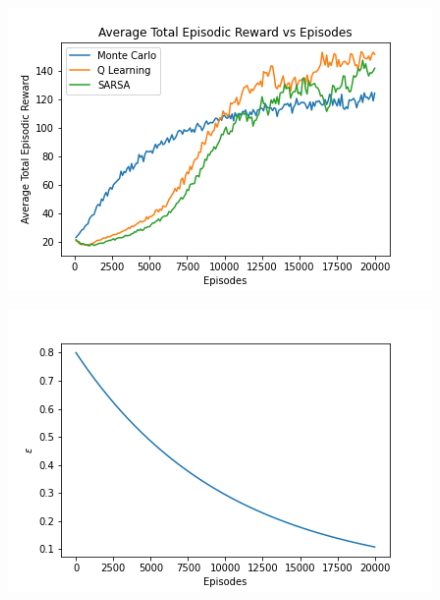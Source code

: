 \documentclass{article}
\begin{document}
\begin{figure}[H]
    \graphicspath{ {../experiments/CartPole/} }
    \centering
    \begin{minipage}{.5\textwidth}
      \centering
      \includegraphics[width=\linewidth]{CartPole.png}
      \label{fig:test1}
    \end{minipage}%
    \begin{minipage}{.5\textwidth}
      \centering
      \includegraphics[width=\linewidth]{Cartpole_epsilon.png}
      \label{fig:test2}
    \end{minipage}
    \end{figure}
\end{document}
